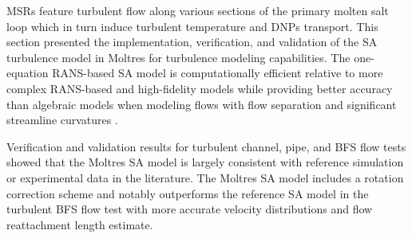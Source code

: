 \glspl{MSR} feature turbulent flow along various sections of the primary molten salt loop which in
turn induce turbulent temperature and \glspl{DNP} transport. This section presented the
implementation, verification, and validation of the \gls{SA} turbulence model
\cite{spalart_one-equation_1994} in Moltres for turbulence
modeling capabilities. The one-equation \gls{RANS}-based \gls{SA} model is computationally
efficient relative to more complex \gls{RANS}-based and high-fidelity models while providing better
accuracy than algebraic models when modeling flows with flow separation and significant streamline
curvatures \cite{wilcox_turbulence_2006}.

Verification and validation results for turbulent channel, pipe, and \gls{BFS} flow tests showed
that the Moltres \gls{SA} model is largely consistent with reference simulation or experimental
data in the literature. The Moltres \gls{SA} model includes a rotation correction scheme
\cite{aupoix_extensions_2003, dacles-mariani_numericalexperimental_1995} and notably outperforms
the reference \gls{SA} model in the turbulent \gls{BFS} flow test with more accurate velocity
distributions and flow reattachment length estimate.
